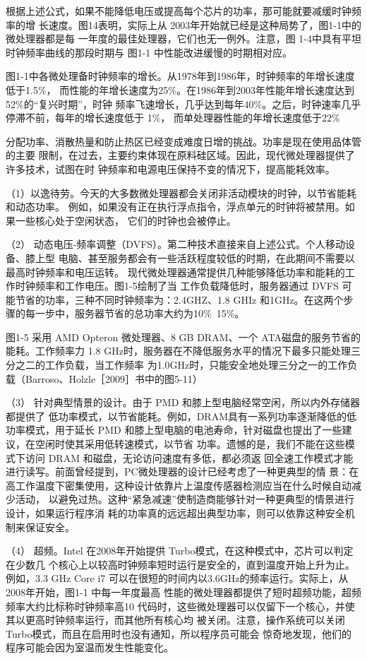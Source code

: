 根据上述公式，如果不能降低电压或提高每个芯片的功率，那可能就要减缓时钟频率的增
长速度。图14表明，实际上从 2003年开始就已经是这种局势了，图1-1中的微处理器都是每
一年度的最佳处理器，它们也无一例外。注意，图 1-4中具有平坦时钟频率曲线的那段时期与
图1-1 中性能改进缓慢的时期相对应。

图1-1中各微处理备时钟频率的增长。从1978年到1986年，时钟频率的年增长速度低于1.5\%，
而性能的年增长速度为25\%。在1986年到2003年性能年增长速度达到52\%的“复兴时期”，时钟
频率飞速增长，几乎达到每年40\%。之后，时钟速率几乎停滞不前，每年的增长速度低于 1\%，
而单处理器性能的年增长速度低于22\%

分配功率、消散热量和防止热区已经变成难度日增的挑战。功率是现在使用品体管的主要
限制，在过去，主要约束体现在原料硅区域。因此，现代微处理器提供了许多技术，试图在时
钟频率和电源电压保持不变的情况下，提高能耗效率。

（1）以逸待劳。今天的大多数微处理器都会关闭非活动模块的时钟，以节省能耗和动态功率。
例如，如果没有正在执行浮点指令，浮点单元的时钟将被禁用。如果一些核心处于空闲状态，
它们的时钟也会被停止。

（2） 动态电压-频率调整（DVFS）。第二种技术直接来自上述公式。个人移动设备、膝上型
电脑、甚至服务都会有一些活跃程度较低的时期，在此期间不需要以最高时钟频率和电压运转。
现代微处理器通常提供几种能够降低功率和能耗的工作时钟频率和工作电压。图1-5绘制了当
工作负载降低时，服务器通过 DVFS 可能节省的功率，三种不同时钟频率为：2.4GHZ、1.8 GHIz
和1GHz。在这两个步骤的每一步中，服务器节省的总功率大约为10\%~15\%。

图1-5
采用 AMD Opteron 微处理器、8 GB DRAM、一个 ATA磁盘的服务节省的能耗。工作频率力
1.8 GHz时，服务器在不降低服务水平的情况下最多只能处理三分之二的工作负载，当工作频率
为1.0GHz时，只能安全地处理三分之一的工作负载（Barroso、Holzle［2009］书中的图5-11）

（3） 针对典型情景的设计。由于 PMD 和膝上型电脑经常空闲，所以内外存储器都提供了
低功率模式，以节省能耗。例如，DRAM具有一系列功率逐渐降低的低功率模式，用于延长 PMD
和膝上型电脑的电池寿命，针对磁盘也提出了一些建议，在空闲时使其采用低转速模式，以节省
功率。遗憾的是，我们不能在这些模式下访问 DRAM 和磁盘，无论访问速度有多低，都必须返
回全速工作模式才能进行读写。前面曾经提到，PC微处理器的设计已经考虑了一种更典型的情
景：在高工作温度下密集使用，这种设计依靠片上温度传感器检测应当在什么时候自动减少活动，
以避免过热。这种“紧急减速”使制造商能够针对一种更典型的情景进行设计，如果运行程序消
耗的功率真的远远超出典型功率，则可以依靠这种安全机制来保证安全。

（4） 超频。Intel 在2008年开始提供 Turbo模式，在这种模式中，芯片可以判定在少数几
个核心上以较高时钟频率短时运行是安全的，直到温度开始上升为止。例如，3.3 GHz Core i7
可以在很短的时间内以3.6GHz的频率运行。实际上，从2008年开始，图1-1 中每一年度最高
性能的微处理器都提供了短时超频功能，超频频率大约比标称时钟频率高10%
代码时，这些微处理器可以仅留下一个核心，并使其以更高时钟频率运行，而其他所有核心均
被关闭。注意，操作系统可以关闭 Turbo模式，而且在启用时也没有通知，所以程序员可能会
惊奇地发现，他们的程序可能会因为室温而发生性能变化。

